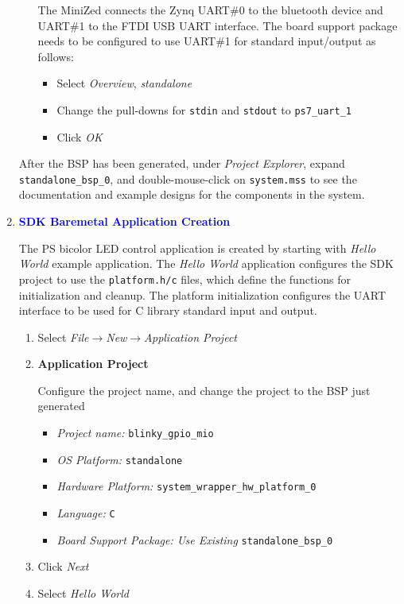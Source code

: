 \begin{enumerate}
\begin{enumerate}
The MiniZed connects the Zynq UART\#0 to the bluetooth device and UART\#1 to the
FTDI USB UART interface. The board support package needs to be configured to use
UART\#1 for standard input/output as follows:

\begin{itemize}
\item Select \emph{Overview}, \emph{standalone}
\item Change the pull-downs for \texttt{stdin} and \texttt{stdout} to \texttt{ps7\_uart\_1}
\item Click \emph{OK}
\end{itemize}
\end{enumerate}

After the BSP has been generated, under \emph{Project Explorer}, expand
\texttt{standalone\_bsp\_0}, and double-mouse-click on \texttt{system.mss} to
see the documentation and example designs for the components in the system.

\item \textcolor{blue}{\textbf{SDK Baremetal Application Creation}}

The PS bicolor LED control application is created by starting with \emph{Hello World}
example application. The \emph{Hello World} application configures the SDK
project to use the \texttt{platform.h/c} files, which define the functions for
initialization and cleanup. The platform initialization configures the
UART interface to be used for C library standard input and output.

\begin{enumerate}
\item Select \emph{File}$\rightarrow$\emph{New}$\rightarrow$\emph{Application Project}
\item \textbf{Application Project}

Configure the project name, and change the project to the BSP just generated
\begin{itemize}
\item \emph{Project name:} \texttt{blinky\_gpio\_mio}
\item \emph{OS Platform:} \texttt{standalone}
\item \emph{Hardware Platform:} \texttt{system\_wrapper\_hw\_platform\_0}
\item \emph{Language:} \texttt{C}
\item \emph{Board Support Package: Use Existing} \texttt{standalone\_bsp\_0}
\end{itemize}
\item Click \emph{Next}
\item Select \emph{Hello World}


\end{enumerate}
\end{enumerate}
